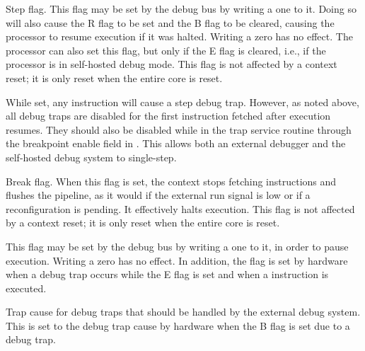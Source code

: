 \implementation{}

Step flag. This flag may be set by the debug bus by writing a one to it. Doing
so will also cause the R flag to be set and the B flag to be cleared, causing
the processor to resume execution if it was halted. Writing a zero has no
effect. The processor can also set this flag, but only if the E flag is cleared,
i.e., if the processor is in self-hosted debug mode. This flag is not affected 
by a context reset; it is only reset when the entire core is reset.

While set, any instruction will cause a step debug trap. However, as noted
above, all debug traps are disabled for the first instruction fetched after
execution resumes. They should also be disabled while in the trap service
routine through the breakpoint enable field in . This allows both an
external debugger and the self-hosted debug system to single-step.

\implementation{}

Break flag. When this flag is set, the context stops fetching instructions and
flushes the pipeline, as it would if the external run signal is low or if a
reconfiguration is pending. It effectively halts execution. This flag is not 
affected by a context reset; it is only reset when the entire core is reset.

This flag may be set by the debug bus by writing a one to it, in order to pause
execution. Writing a zero has no effect. In addition, the flag is set by
hardware when a debug trap occurs while the E flag is set and when a 
instruction is executed.

\implementation{}

Trap cause for debug traps that should be handled by the external debug system.
This is set to the debug trap cause by hardware when the B flag is set due to a
debug trap.

